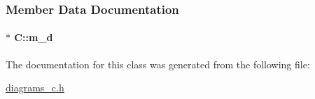 \subsubsection{Member Data Documentation}
\paragraph[{\texorpdfstring{m\+\_\+d}{m_d}}]{$\ast$ C\+::m\+\_\+d}\hypertarget{class_c_a4ef972d28b73ff78eba3ab4f54c3b449}{}\label{class_c_a4ef972d28b73ff78eba3ab4f54c3b449}


The documentation for this class was generated from the following file\+:\begin{DoxyCompactItemize}
\item 
\hyperlink{diagrams__c_8h}{diagrams\+\_\+c.\+h}\end{DoxyCompactItemize}
